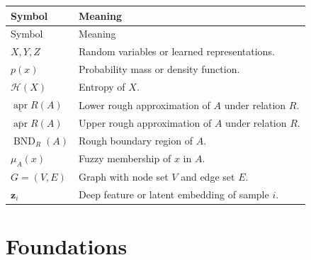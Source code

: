 \documentclass[11pt,oneside]{book}
\theoremstyle{remark}
\newcommand{\Entropy}{\mathcal{H}}
\newcommand{\Lower}{\underline{\operatorname{apr}}}
\newcommand{\Upper}{\overline{\operatorname{apr}}}
\newcommand{\Boundary}{\operatorname{BND}}
\begin{document}
	\begin{longtable}{p{}p{}}
		\toprule
		Symbol & Meaning \\
		\midrule
		\endfirsthead
		
		\toprule
		Symbol & Meaning \\
		\midrule
		\endhead
		
		\(X,Y,Z\) &
		Random variables or learned representations.
		\\
		
		\(p(x)\) &
		Probability mass or density function.
		\\
		
		\(\Entropy(X)\) &
		Entropy of \(X\).
		\\
		
		\(\Lower{R}(A)\) &
		Lower rough approximation of \(A\) under relation \(R\).
		\\
		
		\(\Upper{R}(A)\) &
		Upper rough approximation of \(A\) under relation \(R\).
		\\
		
		\(\Boundary_R(A)\) &
		Rough boundary region of \(A\).
		\\
		
		\(\mu_A(x)\) &
		Fuzzy membership of \(x\) in \(A\).
		\\
		
		\(G=(V,E)\) &
		Graph with node set \(V\) and edge set \(E\).
		\\
		
		\(\bm{z}_i\) &
		Deep feature or latent embedding of sample \(i\).
		\\
		
		\bottomrule
	\end{longtable}
	
	\tableofcontents
	\listoffigures
	\listoftables
	
	
	\mainmatter
	
	
	\part{Foundations}
	
\end{document}
